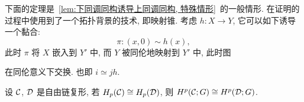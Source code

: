下面的定理是~\ref{lem:下同调同构诱导上同调同构, 特殊情形}~的一般情形. 在证明的过程中使用到了一个拓扑背景的技术, 即映射锥. 考虑 $ h : X\to Y $, 它可以如下诱导一个黏合:
\[
	\pi : (x,0)\sim h(x),
\]
此时 $ \pi $ 将 $ X $ 嵌入到 $ Y' $ 中, 而 $ Y $ 被同伦地映射到 $ Y' $ 中, 此时图
\begin{center}
\end{center}
在同伦意义下交换. 也即 $ i\simeq jh $.

\begin{Theorem}
	设 $ \mathcal{C} $, $ \mathcal{D} $ 是自由链复形, 若 $ H_p(\mathcal{C})\cong H_p(\mathcal{D}) $, 则 $ H^p(\mathcal{C};G)\cong H^p(\mathcal{D};G) $.
\end{Theorem}
